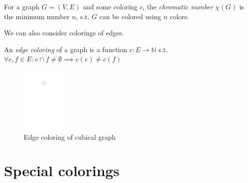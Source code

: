 \begin{definition}
    For a graph $G=(V,E)$ and some coloring $c$, the \textit{chromatic number} $\chi(G)$ is the minimum number $n$, s.t. $G$ can be colored using $n$ colors.
\end{definition}

We can also consider colorings of edges.

\begin{definition}
    An \textit{edge coloring} of a graph is a function $c: E \rightarrow \mathbb{N}$ s.t. $\forall e,f \in E : e \cap f \neq \emptyset \implies c(e) \neq c(f)$
\end{definition}

\begin{figure}[H]
    \centering
    \includegraphics[width=0.2\textwidth]{../Resources/Figs/cubical_edg_colr.pdf}
    \caption{Edge coloring of cubical graph}
    \label{fig:cubical_edge_coloring}
\end{figure}

\section{Special colorings}